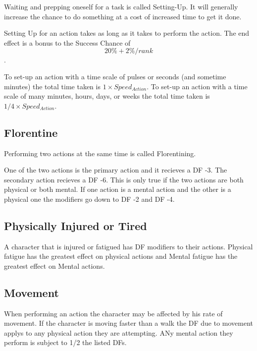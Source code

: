 Waiting and prepping oneself for a task is called Setting-Up. It will generally increase 
the chance to do something at a cost of increased time to get it done.

Setting Up for an action takes as long as it takes to perform the action. The end effect is a
bonus to the Success Chance of \[ 20\% + 2\%/rank\]. 

To set-up an action with a time scale of pulses or seconds (and sometime minutes) the total time taken is \( 1 \times Speed_{Action} \).
To set-up an action with a time scale of many minutes, hours, days, or weeks the total time taken is \( 1/4 \times Speed_{Action} \).  

\subsection{Florentine}

Performing two actions at the same time is called Florentining.

One of the two actions is the primary action and it recieves a 
DF -3. The secondary action recieves a DF -6. This is only true 
if the two actions are both physical or both mental. If one 
action is a mental action and the other is a physical one the modifiers
go down to DF -2 and DF -4.



\subsection{Physically Injured or Tired}

A character that is injured or fatigued has DF modifiers to 
their actions. Physical fatigue has the greatest effect on physical actions 
and Mental fatigue has the greatest effect on Mental actions.




\subsection{{Movement}}

When performing an action the character may be affected by 
his rate of movement. If the character is moving faster than a 
walk the DF due to movement applys to any physical action they are 
attempting. ANy mental action they perform is subject to 1/2 
the listed DFs.


